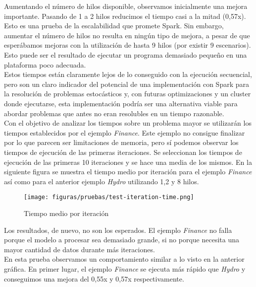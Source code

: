 Aumentando el número de hilos disponible, observamos inicialmente una mejora importante. Pasando de 1 a 2 hilos reducimos el tiempo casi a la mitad (0,57x). Esto es una prueba de la escalabilidad que promete Spark. Sin embargo, aumentar el número de hilos no resulta en ningún tipo de mejora, a pesar de que esperábamos mejoras con la utilización de hasta 9 hilos (por existir 9 escenarios). Esto puede ser el resultado de ejecutar un programa demasiado pequeño en una plataforma poco adecuada. \\

Estos tiempos están claramente lejos de lo conseguido con la ejecución secuencial, pero son un claro indicador del potencial de una implementación con Spark para la resolución de problemas estocásticos y, con futuras optimizaciones y un cluster donde ejecutarse, esta implementación podría ser una alternativa viable para abordar problemas que antes no eran resolubles en un tiempo razonable.\\

Con el objetivo de analizar los tiempos sobre un problema mayor se utilizarán los tiempos establecidos por el ejemplo \textit{Finance}. Este ejemplo no consigue finalizar por lo que parecen ser limitaciones de memoria, pero sí podemos observar los tiempos de ejecución de las primeras iteraciones. Se seleccionan los tiempos de ejecución de las primeras 10 iteraciones y se hace una media de los mismos. En la siguiente figura se muestra el tiempo medio por iteración para el ejemplo \textit{Finance} así como para el anterior ejemplo \textit{Hydro} utilizando 1,2 y 8 hilos.\\

\begin{figure}[H]
    \centerline{\texttt{[image: figuras/pruebas/test-iteration-time.png]}}
    \caption{Tiempo medio por iteración}
    \label{fig:test-iteration-time}
\end{figure}

Los resultados, de nuevo, no son los esperados. El ejemplo \textit{Finance} no falla porque el modelo a procesar sea demasiado grande, si no porque necesita una mayor cantidad de datos durante más iteraciones. \\

En esta prueba observamos un comportamiento similar a lo visto en la anterior gráfica. En primer lugar, el ejemplo \textit{Finance} se ejecuta más rápido que \textit{Hydro} y conseguimos una mejora del 0,55x y 0,57x respectivamente. 